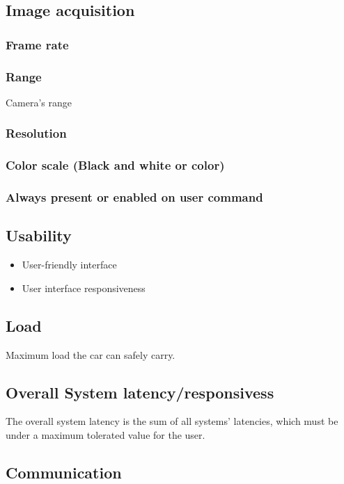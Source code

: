 \documentclass[11pt]{article}
\begin{document}
\subsection{Image acquisition}
\label{sec:org7c6e617}
\subsubsection{Frame rate}
\label{sec:orgc44cea4}
\subsubsection{Range}
\label{sec:org7ecd940}
Camera's range
\subsubsection{Resolution}
\label{sec:orgb7a7db5}
\subsubsection{Color scale (Black and white or color)}
\label{sec:org8317faa}
\subsubsection{Always present or enabled on user command}
\label{sec:org64617a1}
\subsection{Usability}
\label{sec:org2063922}
\begin{itemize}
\item User-friendly interface
\item User interface responsiveness
\end{itemize}
\subsection{Load}
\label{sec:org1b54b04}
Maximum load the car can safely carry.
\subsection{Overall System latency/responsivess}
\label{sec:org826af3d}
The overall system latency is the sum of all systems' latencies, which must be
under a maximum tolerated value for the user.
\subsection{Communication}
\label{sec:org2a30eff}
\end{document}
